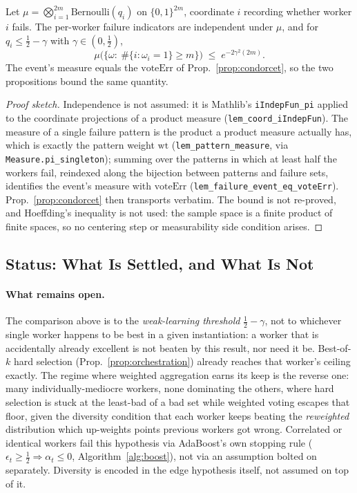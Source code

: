 \begin{proposition}
\label{prop:condorcet-prob}
Let $\mu=\bigotimes_{i=1}^{2m}\mathrm{Bernoulli}(q_i)$ on $\{0,1\}^{2m}$, coordinate $i$ recording whether worker $i$ fails. The per-worker failure indicators are independent under $\mu$, and for $q_i\le\tfrac12-\gamma$ with $\gamma\in(0,\tfrac12)$,
\[
\mu\bigl(\{\omega:\ \#\{i:\omega_i=1\}\ge m\}\bigr) \;\le\; e^{-2\gamma^2(2m)} .
\]
The event's measure equals the $\mathrm{voteErr}$ of Prop.~\ref{prop:condorcet}, so the two propositions bound the same quantity.
\end{proposition}

\begin{proof}[Proof sketch]
Independence is not assumed: it is Mathlib's \texttt{iIndepFun\_pi} applied to the coordinate projections of a product measure (\texttt{lem\_coord\_iIndepFun}). The measure of a single failure pattern is the product a product measure actually has, which is exactly the pattern weight $\mathrm{wt}$ (\texttt{lem\_pattern\_measure}, via \texttt{Measure.pi\_singleton}); summing over the patterns in which at least half the workers fail, reindexed along the bijection between patterns and failure sets, identifies the event's measure with $\mathrm{voteErr}$ (\texttt{lem\_failure\_event\_eq\_voteErr}). Prop.~\ref{prop:condorcet} then transports verbatim. The bound is not re-proved, and Hoeffding's inequality is not used: the sample space is a finite product of finite spaces, so no centering step or measurability side condition arises.
\end{proof}


\subsection{Status: What Is Settled, and What Is Not}

\paragraph{What remains open.} The comparison above is to the \emph{weak-learning threshold} $\tfrac12-\gamma$, not to whichever single worker happens to be best in a given instantiation: a worker that is accidentally already excellent is not beaten by this result, nor need it be. Best-of-$k$ hard selection (Prop.~\ref{prop:orchestration}) already reaches that worker's ceiling exactly. The regime where weighted aggregation earns its keep is the reverse one: many individually-mediocre workers, none dominating the others, where hard selection is stuck at the least-bad of a bad set while weighted voting escapes that floor, given the diversity condition that each worker keeps beating the \emph{reweighted} distribution which up-weights points previous workers got wrong. Correlated or identical workers fail this hypothesis via AdaBoost's own stopping rule ($\epsilon_t\ge\tfrac12 \Rightarrow \alpha_t\le0$, Algorithm~\ref{alg:boost}), not via an assumption bolted on separately. Diversity is encoded in the edge hypothesis itself, not assumed on top of it.

